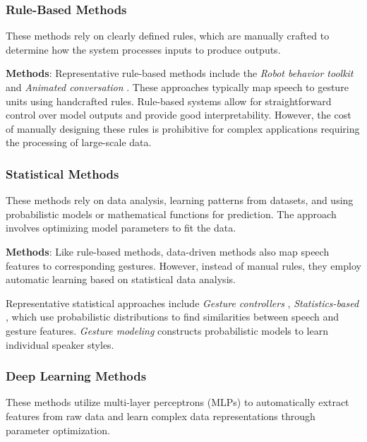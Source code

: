 \subsubsection{Rule-Based Methods}

These methods rely on clearly defined rules, which are manually crafted to determine how the system processes inputs to produce outputs.

\textbf{Methods}: Representative rule-based methods include the \textit{Robot behavior toolkit} \cite{huang2012robot} and \textit{Animated conversation} \cite{cassell1994animated}. These approaches typically map speech to gesture units using handcrafted rules. Rule-based systems allow for straightforward control over model outputs and provide good interpretability.  
However, the cost of manually designing these rules is prohibitive for complex applications requiring the processing of large-scale data.

\subsubsection{Statistical Methods}

These methods rely on data analysis, learning patterns from datasets, and using probabilistic models or mathematical functions for prediction. The approach involves optimizing model parameters to fit the data.


\textbf{Methods}: Like rule-based methods, data-driven methods also map speech features to corresponding gestures. However, instead of manual rules, they employ automatic learning based on statistical data analysis.

Representative statistical approaches include \textit{Gesture controllers} \cite{levine2010gesture}, \textit{Statistics-based} \cite{yang2020statistics}, which use probabilistic distributions to find similarities between speech and gesture features. \textit{Gesture modeling} \cite{neff2008gesture} constructs probabilistic models to learn individual speaker styles.

\subsubsection{Deep Learning Methods}

These methods utilize multi-layer perceptrons (MLPs) to automatically extract features from raw data and learn complex data representations through parameter optimization.

